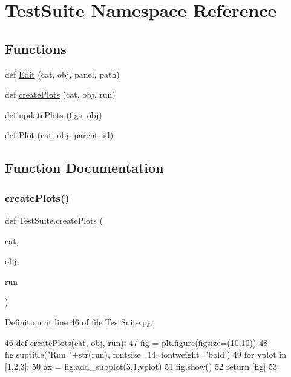 \hypertarget{namespaceTestSuite}{}\section{Test\+Suite Namespace Reference}
\label{namespaceTestSuite}
\subsection*{Functions}
\begin{DoxyCompactItemize}
\item 
def \hyperlink{namespaceTestSuite_a7b3d5b63aa0a4de85e213ad4484861e1}{Edit} (cat, obj, panel, path)
\item 
def \hyperlink{namespaceTestSuite_a346397453a7f5becbc4ee14a3b2b5801}{create\+Plots} (cat, obj, run)
\item 
def \hyperlink{namespaceTestSuite_afd38321f5736c9a017d24fcee3206fed}{update\+Plots} (figs, obj)
\item 
def \hyperlink{namespaceTestSuite_a2ea7dee6a6c49e8e2fb533cb0a6a4c83}{Plot} (cat, obj, parent, \hyperlink{classObject_af99145335cc61ff6e2798ea17db009d2}{id})
\end{DoxyCompactItemize}


\subsection{Function Documentation}
\mbox{\label{namespaceTestSuite_a346397453a7f5becbc4ee14a3b2b5801}} 
\subsubsection{\texorpdfstring{create\+Plots()}{createPlots()}}
{\footnotesize\ttfamily def Test\+Suite.\+create\+Plots (\begin{DoxyParamCaption}\item[{}]{cat,  }\item[{}]{obj,  }\item[{}]{run }\end{DoxyParamCaption})}



Definition at line 46 of file Test\+Suite.\+py.


\begin{DoxyCode}
46 \textcolor{keyword}{def }\hyperlink{namespaceTestSuite_a346397453a7f5becbc4ee14a3b2b5801}{createPlots}(cat, obj, run):
47     fig = plt.figure(figsize=(10,10))
48     fig.suptitle(\textcolor{stringliteral}{"Run "}+str(run), fontsize=14, fontweight=\textcolor{stringliteral}{'bold'})
49     \textcolor{keywordflow}{for} vplot \textcolor{keywordflow}{in} [1,2,3]:
50         ax = fig.add\_subplot(3,1,vplot)
51     fig.show()    
52     \textcolor{keywordflow}{return} [fig]
53 
\end{DoxyCode}
\mbox{\label{namespaceTestSuite_a7b3d5b63aa0a4de85e213ad4484861e1}} 
